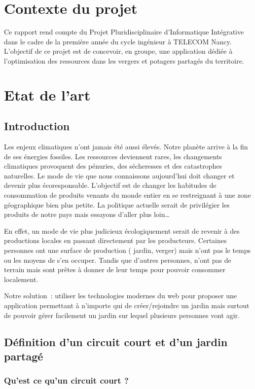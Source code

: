 \documentclass[french,a4paper]{article}
\begin{document}
\newpage
\tableofcontents
\newpage
\section{Contexte du projet}
Ce rapport rend compte du Projet Pluridisciplinaire d’Informatique Intégrative dans le cadre de la première année du cycle ingénieur à TELECOM Nancy.
L’objectif de ce projet est de concevoir, en groupe,  une application dédiée à l’optimisation des ressources dans les vergers et potagers partagés du territoire.

\newpage
\section{Etat de l'art}
\subsection{Introduction}
Les enjeux climatiques n’ont jamais été aussi élevés. Notre planète arrive à la fin de ses énergies fossiles. Les ressources deviennent rares, les changements climatiques provoquent des pénuries, des sécheresses et des catastrophes naturelles. Le mode de vie que nous connaissons aujourd’hui doit changer et devenir plus écoresponsable. L’objectif est de changer les habitudes de consommation de produits venants du monde entier en se restreignant à une zone géographique bien plus petite. La politique actuelle serait de privilégier les produits de notre pays mais essayons d’aller plus loin…

En effet, un mode de vie plus judicieux écologiquement serait de revenir à des productions locales en passant directement par les producteurs. Certaines personnes ont une surface de production ( jardin, verger) mais n’ont pas le temps ou les moyens de s’en occuper. Tandis que d’autres personnes, n’ont pas de terrain mais sont prêtes à donner de leur temps pour pouvoir consommer localement.

Notre solution~: utiliser les technologies modernes du web pour proposer une application permettant à n’importe qui de créer/rejoindre un jardin mais surtout de pouvoir gérer facilement un jardin sur lequel plusieurs personnes vont agir.

\subsection{Définition d’un circuit court et d’un jardin partagé}
\subsubsection{Qu’est ce qu’un circuit court ?}
\end{document}
